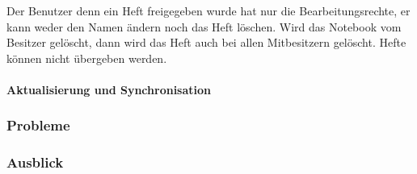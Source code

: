 Der Benutzer denn ein Heft freigegeben wurde hat nur die Bearbeitungsrechte, er kann weder den Namen ändern noch das Heft löschen. Wird das Notebook vom Besitzer gelöscht, dann wird das Heft auch bei allen Mitbesitzern gelöscht. Hefte können nicht übergeben werden.
\paragraph{Aktualisierung und Synchronisation}
\subsubsection{Probleme}
\subsubsection{Ausblick}


